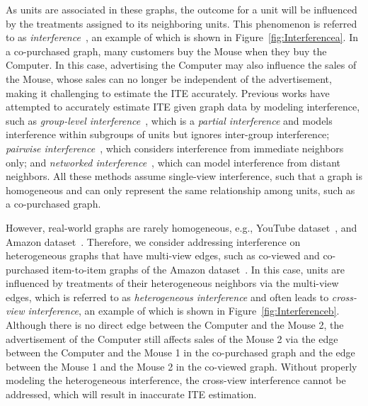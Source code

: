 \documentclass[runningheads]{llncs}
\begin{document}
As units are associated in these graphs, the outcome for a unit will be influenced by the treatments assigned to its neighboring units. This phenomenon is referred to as \emph{interference}~\cite{pmlr-v130-ma21c,rakesh2018linked}, an example of which is shown in Figure~\ref{fig:Interferencea}. In a co-purchased graph, many customers buy the Mouse when they buy the Computer. In this case, advertising the Computer may also influence the sales of the Mouse, whose sales can no longer be independent of the advertisement, making it challenging to estimate the ITE accurately.
Previous works have attempted to accurately estimate ITE given graph data by modeling interference, such as \emph{group-level interference}~\cite{doi:10.1198/016214508000000292,liu2014large,tchetgen2012causal}, which is a \emph{partial interference} and models interference within subgroups of units but ignores inter-group interference; \emph{pairwise interference}~\cite{Aronow2017EstimatingAC,doi:10.1080/01621459.2020.1768100,rakesh2018linked,RePEc:arx:papers:1906.10258}, which considers interference from  immediate neighbors only; and \emph{networked interference}~\cite{pmlr-v130-ma21c}, which can model interference from distant neighbors. All these methods assume single-view interference, such that a graph is homogeneous and can only represent the same relationship among units, such as a co-purchased graph. 

However, real-world graphs are rarely homogeneous, e.g., YouTube dataset~\cite{tang2009uncoverning}, and Amazon dataset~\cite{he2016ups}.
Therefore, we consider addressing interference on heterogeneous graphs that have multi-view edges,  such as co-viewed and co-purchased item-to-item graphs of the Amazon dataset~\cite{he2016ups}. 
In this case, units are influenced by treatments of their heterogeneous neighbors via the multi-view edges, which is referred to as \emph{heterogeneous interference} and often leads to \emph{cross-view interference}, an example of which is shown in Figure~\ref{fig:Interferenceb}.  Although there is no direct edge between the Computer and the Mouse 2, the advertisement of the Computer still affects sales of the Mouse 2 via the edge between the Computer and the Mouse 1 in the co-purchased graph and the edge between the Mouse 1 and the Mouse 2 in the co-viewed graph. Without properly modeling the heterogeneous interference, the cross-view interference cannot be addressed, which will result in inaccurate ITE estimation.
\end{document}
